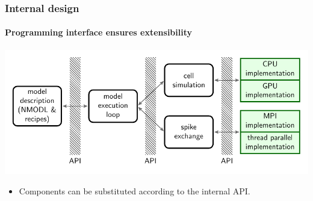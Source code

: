 \documentclass[t]{beamer}
\begin{document}

\begin{frame}
    \frametitle{Internal design}
    \framesubtitle{Programming interface ensures extensibility}
    \begin{center}
        \includegraphics[width=0.9\linewidth]{api.pdf}
    \end{center}
    \begin{itemize}
    \item Components can be substituted according to the internal API.
    \end{itemize}
\end{frame}

\end{document}
